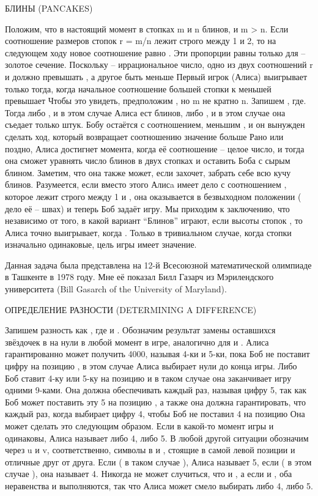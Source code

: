  БЛИНЫ (PANCAKES)


  Положим, что в настоящий момент в стопках m и n блинов, и m > n. Если соотношение размеров стопок  r = m/n лежит строго между 1 и 2, то на следующем ходу новое соотношение равно . Эти пропорции равны только для  -- золотое сечение. Поскольку  -- иррациональное число, одно из двух соотношений r  и  должно превышать , а другое быть меньше 
   Первый игрок (Алиса) выигрывает только тогда, когда начальное соотношение большей стопки к меньшей превышает  Чтобы это увидеть, предположим , но m не кратно n. Запишем  , где. Тогда либо , и в этом случае Алиса ест блинов, либо , и в этом случае она съедает только  штук.
Бобу остаётся  с соотношением, меньшим , и он вынужден сделать ход, который возвращает соотношению значение больше 
   Рано или поздно, Алиса достигнет момента, когда её соотношение  -- целое число, и тогда она сможет уравнять число блинов в двух стопках  и оставить Боба с сырым блином. Заметим, что она также может, если захочет, забрать себе всю кучу блинов.
   Разумеется, если вместо этого  Алисa имеет дело  с соотношением , которое лежит строго между 1 и , она оказывается в безвыходном положении ( дело её -- швах) и теперь Боб  задаёт игру. 
    Мы приходим к заключению, что независимо от того, в какой вариант “Блинов” играют, если высоты стопок , то Алиса точно выигрывает, когда . Только в тривиальном случае, когда стопки изначально одинаковые, цель игры имеет значение.


   Данная задача была представлена на 12-й Всесоюзной математической олимпиаде в Ташкенте в 1978 году. Мне её показал Билл Газарч  из Мэрилендского университета (Bill Gasarch of the University of Maryland).




ОПРЕДЕЛЕНИЕ РАЗНОСТИ (DETERMINING A DIFFERENCE)


   Запишем разность как , где  и . Обозначим  результат замены оставшихся звёздочек в на нули в любой момент в игре, аналогично  для  и  . Алиса гарантированно может получить 4000, называя 4-ки и 5-ки, пока Боб не поставит цифру на позицию , в этом случае Алиса выбирает нули до конца игры.
Либо Боб ставит 4-ку или 5-ку на позицию  и в таком случае она заканчивает игру одними 9-ками. Она должна обеспечивать  каждый раз, называя цифру 5, так как Боб может поставить эту 5 на позицию , а также она должна гарантировать, что  каждый раз, когда выбирает цифру 4, чтобы Боб не поставил 4 на позицию Она может сделать это следующим образом.
   Если в какой-то момент игры  и  одинаковы, Алиса называет либо 4, либо 5. В любой другой ситуации обозначим через u и v, соответственно, символы в  и , стоящие в самой левой позиции и отличные друг от друга. Если ( в таком случае ), Алиса называет 5, если ( в этом случае ), она называет 4. Никогда не может случиться, что  и  , а если  и  , оба неравенства   и  выполняются, так что Алиса может смело выбирать либо 4, либо 5.
    
